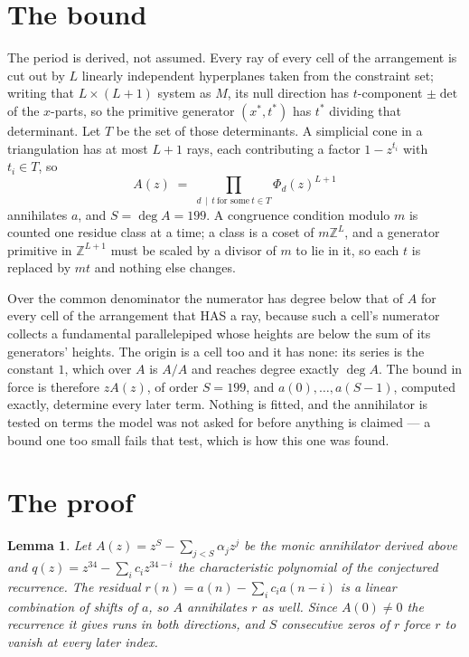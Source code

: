 \documentclass[11pt,a4paper]{article}
\theoremstyle{plain}
\newtheorem{lemma}[theorem]{Lemma}
\theoremstyle{definition}
\begin{document}
\section{The bound}

The period is derived, not assumed. Every ray of every cell of the arrangement is cut out by
$L$ linearly independent hyperplanes taken from the constraint set; writing that $L\times(L+1)$
system as $M$, its null direction has $t$-component $\pm\det$ of the $x$-parts, so the
primitive generator $(x^*,t^*)$ has $t^*$ dividing that determinant. Let $T$ be the set of
those determinants. A simplicial cone in a triangulation has at most $L+1$ rays, each
contributing a factor $1-z^{t_i}$ with $t_i\in T$, so
\[
A(z)\;=\;\prod_{d\,\mid\,t\ \text{for some}\ t\in T}\Phi_d(z)^{L+1}
\]
annihilates $a$, and $S=\deg A=199$. A congruence condition modulo $m$ is counted one residue
class at a time; a class is a coset of $m\mathbb{Z}^L$, and a generator primitive in
$\mathbb{Z}^{L+1}$ must be scaled by a divisor of $m$ to lie in it, so each $t$ is replaced
by $mt$ and nothing else changes.

Over the common denominator the numerator has degree below that of $A$ for every cell of the
arrangement that HAS a ray, because such a cell's numerator collects a fundamental
parallelepiped whose heights are below the sum of its generators' heights. The origin is a cell
too and it has none: its series is the constant $1$, which over $A$ is $A/A$ and reaches degree
exactly $\deg A$. The bound in force is therefore $zA(z)$, of order $S=199$, and
$a(0),\dots,a(S-1)$, computed exactly, determine every later term. Nothing is fitted, and the
annihilator is tested on terms the model was not asked for before anything is claimed --- a
bound one too small fails that test, which is how this one was found.

\section{The proof}

\begin{lemma}\label{lem:crit}
Let $A(z)=z^S-\sum_{j<S}\alpha_jz^{j}$ be the monic annihilator derived above and
$q(z)=z^{34}-\sum_ic_iz^{34-i}$ the characteristic polynomial of the conjectured
recurrence. The residual $r(n)=a(n)-\sum_ic_ia(n-i)$ is a linear combination of shifts of $a$,
so $A$ annihilates $r$ as well. Since $A(0)\ne0$ the recurrence it gives runs in both
directions, and $S$ consecutive zeros of $r$ force $r$ to vanish at every later index.
\end{lemma}
\end{document}
